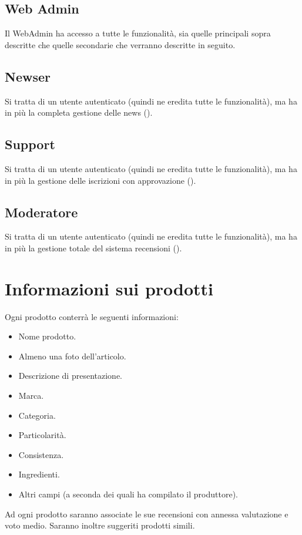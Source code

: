\subsection{Web Admin}
Il WebAdmin ha accesso a tutte le funzionalità, sia quelle principali sopra descritte che quelle secondarie che verranno descritte in seguito.

\subsection{Newser}
Si tratta di un utente autenticato (quindi ne eredita tutte le funzionalità), ma ha in più la completa gestione delle news ().

\subsection{Support}
Si tratta di un utente autenticato (quindi ne eredita tutte le funzionalità), ma ha in più la gestione delle iscrizioni con approvazione ().

\subsection{Moderatore}
Si tratta di un utente autenticato (quindi ne eredita tutte le funzionalità), ma ha in più la gestione totale del sistema recensioni ().

\section{Informazioni sui prodotti}
Ogni prodotto conterrà le seguenti informazioni:
\begin{itemize}
	\item Nome prodotto. 
	\item Almeno una foto dell’articolo.
	\item  Descrizione di presentazione.
	\item  Marca.
	\item Categoria.
	\item Particolarità.
	\item Consistenza.
	\item Ingredienti.
	\item Altri campi (a seconda dei quali ha compilato il produttore).
\end{itemize}
Ad ogni prodotto saranno associate le sue recensioni con annessa valutazione e voto medio. Saranno inoltre suggeriti prodotti simili.
